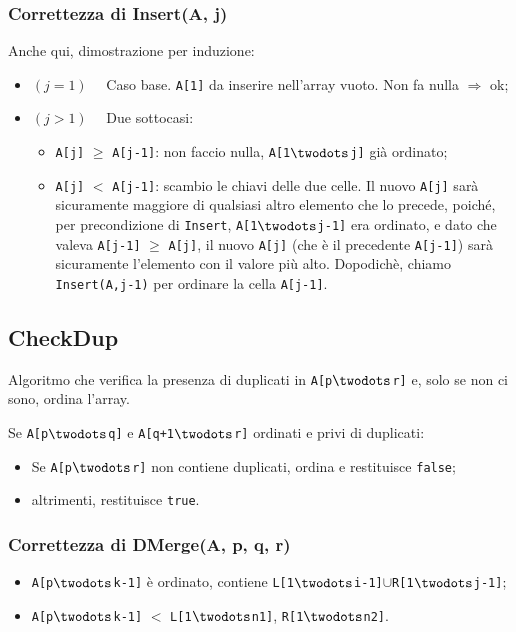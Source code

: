 \subsubsection{Correttezza di Insert(A, j)}
Anche qui, dimostrazione per induzione:
\begin{itemize}
	\item[] $(j = 1) \quad$ Caso base. \texttt{A[1]} da inserire nell'array vuoto. Non fa nulla
	$\Rightarrow$ ok;
	\item[] $(j > 1) \quad$ Due sottocasi:
	\begin{itemize}
		\item \texttt{A[j]} $\geq$ \texttt{A[j-1]}: non faccio nulla, \texttt{A[1$\twodots$j]} già
		ordinato;
		\item \texttt{A[j]} $<$ \texttt{A[j-1]}: scambio le chiavi delle due celle. Il nuovo \texttt{A[j]}
		sarà sicuramente maggiore di qualsiasi altro elemento che lo precede, poiché, per precondizione di 
		\texttt{Insert}, \texttt{A[1$\twodots$j-1]} era ordinato, e dato che valeva \texttt{A[j-1]} $\geq$ 
		\texttt{A[j]}, il nuovo \texttt{A[j]} (che è il precedente \texttt{A[j-1]}) sarà sicuramente l'elemento con il valore più alto. 
		Dopodichè, chiamo \texttt{Insert(A,j-1)} per ordinare la cella \texttt{A[j-1]}.
 	\end{itemize}
\end{itemize}
 
\subsection{CheckDup}
Algoritmo che verifica la presenza di duplicati in \texttt{A[p$\twodots$r]} e, 
solo se non ci sono, ordina l'array.

Se \texttt{A[p$\twodots$q]} e \texttt{A[q+1$\twodots$r]} ordinati e privi di duplicati:
\begin{itemize}[noitemsep]
	\item Se \texttt{A[p$\twodots$r]} non contiene duplicati, ordina e restituisce \texttt{false};
	\item altrimenti, restituisce \texttt{true}.
\end{itemize}





\subsubsection{Correttezza di DMerge(A, p, q, r)}
\begin{itemize}
	\item \texttt{A[p$\twodots$k-1]} è ordinato, contiene \texttt{L[1$\twodots$i-1]}$\cup$\texttt{R[1$\twodots$j-1]};
	\item \texttt{A[p$\twodots$k-1]} $<$ \texttt{L[1$\twodots$n1]}, \texttt{R[1$\twodots$n2]}.
\end{itemize}

